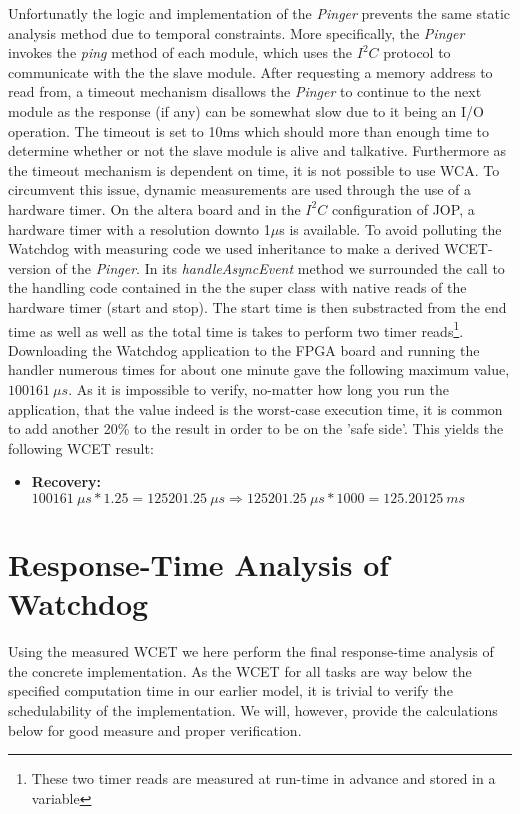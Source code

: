 Unfortunatly the logic and implementation of the \textit{Pinger} prevents the same static analysis method due to temporal constraints. More specifically, the \textit{Pinger} invokes the \textit{ping} method of each module, which uses the $\textit{I}^2\textit{C}$ protocol to communicate with the the slave module. After requesting a memory address to read from, a timeout mechanism disallows the \textit{Pinger} to continue to the next module as the response (if any) can be somewhat slow due to it being an I/O operation. The timeout is set to 10ms which should more than enough time to determine whether or not the slave module is alive and talkative. Furthermore as the timeout mechanism is dependent on time, it is not possible to use WCA. To circumvent this issue, dynamic measurements are used through the use of a hardware timer. On the altera board and in the $\textit{I}^2\textit{C}$ configuration of JOP, a hardware timer with a resolution downto 1$\mu$s is available. To avoid polluting the Watchdog with measuring code we used inheritance to make a derived WCET-version of the \textit{Pinger}. In its \textit{handleAsyncEvent} method we surrounded the call to the handling code contained in the the super class with native reads of the hardware timer (start and stop). The start time is then substracted from the end time as well as well as the total time is takes to perform two timer reads\footnote{These two timer reads are measured at run-time in advance and stored in a variable}. Downloading the Watchdog application to the FPGA board and running the handler numerous times for about one minute gave the following maximum value, $100161\ \mu s $. As it is impossible to verify, no-matter how long you run the application, that the value indeed is the worst-case execution time, it is common to add another 20\% to the result in order to be on the 'safe side'. This yields the following WCET result:

\begin{itemize}
    \item \textbf{Recovery:} $100161\ \mu s * 1.25 = 125201.25\ \mu s \Rightarrow 125201.25\ \mu s * 1000 = 125.20125\ ms$
\end{itemize}


\section{Response-Time Analysis of Watchdog} %
\label{sec:response_time_analysis_of_watchdog}
Using the measured WCET we here perform the final response-time analysis of the concrete implementation. As the WCET for all tasks are way below the specified computation time in our earlier model, it is trivial to verify the schedulability of the implementation. We will, however, provide the calculations below for good measure and proper verification.

